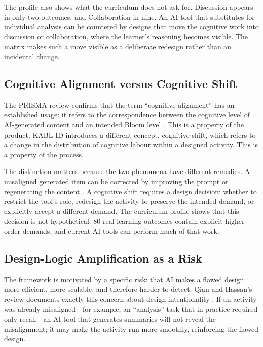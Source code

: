 \documentclass[journal,article,submit,pdftex,moreauthors]{Definitions/mdpi}
\begin{document}
The profile also shows what the curriculum does not ask for. Discussion appears in only two outcomes, and Collaboration in nine. An AI tool that substitutes for individual analysis can be countered by designs that move the cognitive work into discussion or collaboration, where the learner's reasoning becomes visible. The matrix makes such a move visible as a deliberate redesign rather than an incidental change.

\subsection{Cognitive Alignment versus Cognitive Shift}

The PRISMA review confirms that the term ``cognitive alignment'' has an established usage: it refers to the correspondence between the cognitive level of AI-generated content and an intended Bloom level \cite{yaacoub_oneclickquiz_2025, ieee_enhancing_2025}. This is a property of the product. KABL-ID introduces a different concept, cognitive shift, which refers to a change in the distribution of cognitive labour within a designed activity. This is a property of the process.

The distinction matters because the two phenomena have different remedies. A misaligned generated item can be corrected by improving the prompt or regenerating the content \cite{yaacoub_prompt_2025}. A cognitive shift requires a design decision: whether to restrict the tool's role, redesign the activity to preserve the intended demand, or explicitly accept a different demand. The curriculum profile shows that this decision is not hypothetical: 80 real learning outcomes contain explicit higher-order demands, and current AI tools can perform much of that work.

\subsection{Design-Logic Amplification as a Risk}

The framework is motivated by a specific risk: that AI makes a flawed design more efficient, more scalable, and therefore harder to detect. Qian and Hassan's review documents exactly this concern about design intentionality \cite{qian_hassan_2025}. If an activity was already misaligned---for example, an ``analysis'' task that in practice required only recall---an AI tool that generates summaries will not reveal the misalignment; it may make the activity run more smoothly, reinforcing the flawed design.
\end{document}
